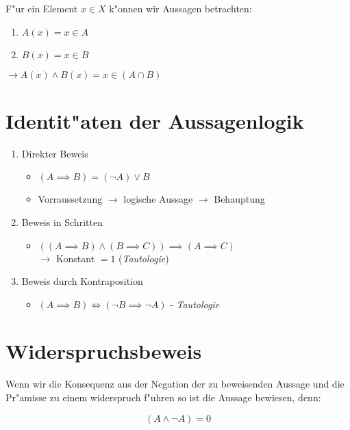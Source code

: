 \documentclass[oneside,fontsize=11pt,paper=a4,BCOR=0mm,DIV=12,automark,headsepline]{scrbook}
\theoremstyle{remark}
\theoremstyle{definition}
\theoremstyle{definition}
\theoremstyle{remark}
\begin{document}
\begin{exa}
  F"ur ein Element \(x\in X\) k"onnen wir Aussagen betrachten:
  \begin{enumerate}
  \item \(A(x)=x\in A\)
  \item \(B(x)=x\in B\)
  \end{enumerate}
  \(\longrightarrow A(x)\wedge B(x)=x\in (A\cap B)\)
\end{exa}

\section{Identit"aten der Aussagenlogik}
\label{sec:orgd743b6e}
\begin{relation}
  \begin{enumerate}
  \item Direkter Beweis 
    \begin{itemize}
    \item \((A\implies B) = (\neg A)\vee B\)
    \item Vorraussetzung \(\rightarrow\) logische Aussage \(\rightarrow\) Behauptung
    \end{itemize}
  \item Beweis in Schritten
    \begin{itemize}
    \item \(((A\implies B)\wedge (B\implies C))\implies (A\implies C)\) \\
      \(\rightarrow\) Konstant \(=1\) (\emph{Tautologie})
    \end{itemize}
  \item Beweis durch Kontraposition
    \begin{itemize}
    \item \((A\implies B) \iff (\neg B \implies \neg A)\) - \emph{Tautologie}
    \end{itemize}
  \end{enumerate}
\end{relation}

\section{Widerspruchsbeweis}
\label{sec:org54c9d02}
Wenn wir die Konsequenz aus der Negation der zu beweisenden Aussage und die
Pr"amisse zu einem widerspruch f"uhren so ist die Aussage bewiesen, denn:
\begin{relation}
  \[(A\wedge \neg A)=0\]
\end{relation}
\end{document}
